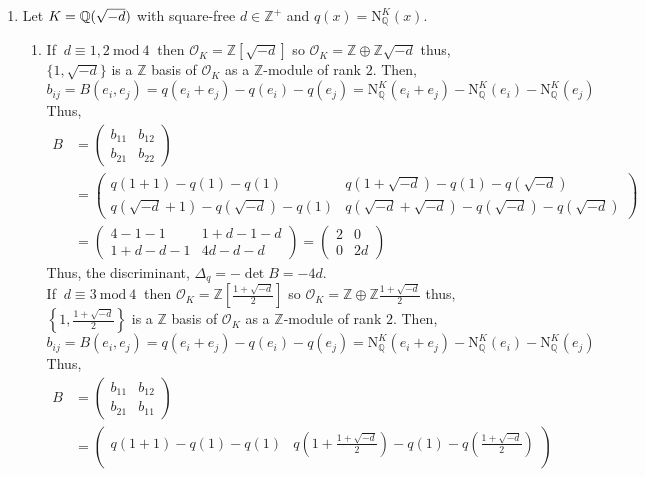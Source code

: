 \documentclass[12pt]{extarticle}
\newcommand{\Z}{\mathbb{Z}}
\newcommand{\Zplus}{\mathbb{Z}^{+}}
\newcommand{\Q}{\mathbb{Q}}
\renewcommand{\mod}[3]{\: #1 \equiv #2 \: \mathrm{mod} \: #3 \:}
\newcommand{\quadfield}[1]{\Q \small(\sqrt{#1} \small)}
\newcommand{\ints}[1]{\mathcal{O}_{#1}}
\newcommand{\qnorm}[2]{\mathrm{N}^{#1}_{\Q}\left(#2\right)}
\begin{document}
\begin{enumerate}
\item Let $K = \quadfield{-d}$ with square-free $d \in \Zplus$ and $q(x) = \qnorm{K}{x}$.
\begin{enumerate}
\item If $\mod{d}{1,2}{4}$ then $\ints{K} = \Z[\sqrt{-d}]$ so $\ints{K} = \Z \oplus \Z \sqrt{-d}$ thus, $\{1, \sqrt{-d}\}$ is a $\Z$ basis of $\ints{K}$ as a $\Z$-module of rank $2$. Then, \[b_{ij} = B(e_i, e_j) = q(e_i + e_j) - q(e_i) - q(e_j) = \qnorm{K}{e_i + e_j} - \qnorm{K}{e_i} - \qnorm{K}{e_j} \] 
Thus, \begin{align*} B &= 
\begin{pmatrix}
b_{11} & b_{12} \\
b_{21} & b_{22}			
\end{pmatrix} \\ &= 
\begin{pmatrix}
q(1 + 1) - q(1) - q(1) & q(1 + \sqrt{-d}) - q(1) - q(\sqrt{-d}) \\
q(\sqrt{-d} + 1) - q(\sqrt{-d}) - q(1) & q(\sqrt{-d} + \sqrt{-d}) - q(\sqrt{-d}) - q(\sqrt{-d}) 				
\end{pmatrix} \\ &= 
\begin{pmatrix}
4 - 1 - 1 & 1 + d - 1 - d \\
1 + d - d - 1 & 4 d - d	- d		
\end{pmatrix} = 
\begin{pmatrix}
2 & 0 \\
0 & 2 d		
\end{pmatrix}
\end{align*}
Thus, the discriminant, $\Delta_q = - \det{B} = -4 d$.\\
If $\mod{d}{3}{4}$ then $\ints{K} = \Z\left[\frac{1 + \sqrt{-d}}{2}\right]$ so $\ints{K} = \Z \oplus \Z \frac{1 + \sqrt{-d}}{2}$ thus, $\left\{1, \frac{1 + \sqrt{-d}}{2} \right\}$ is a $\Z$ basis of $\ints{K}$ as a $\Z$-module of rank $2$. Then, \[b_{ij} = B(e_i, e_j) = q(e_i + e_j) - q(e_i) - q(e_j) = \qnorm{K}{e_i + e_j} - \qnorm{K}{e_i} - \qnorm{K}{e_j} \] 
Thus, \begin{align*} B &= 
\begin{pmatrix}
b_{11} & b_{12} \\
b_{21} & b_{11}			
\end{pmatrix} \\ &= 
\begin{pmatrix}
q(1 + 1) - q(1) - q(1) & q \left(1 + \frac{1 + \sqrt{-d}}{2} \right) - q(1) - q \left( \frac{1 + \sqrt{-d}}{2} \right) \\

\end{pmatrix}
\end{align*}
\end{enumerate}
\end{enumerate}
\end{document}
